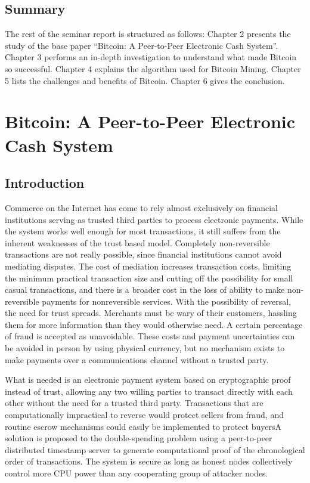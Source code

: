 \section{Summary}
The rest of the seminar report is structured as follows: Chapter 2 presents the
study of the base paper “Bitcoin: A Peer-to-Peer Electronic Cash System”. 
Chapter 3 performs an in-depth investigation to understand what made Bitcoin so 
successful. Chapter 4 explains the algorithm used for Bitcoin Mining. Chapter 5 
lists the challenges and benefits of Bitcoin. Chapter 6 gives the conclusion.

%
%

\chapter{Bitcoin: A Peer-to-Peer Electronic Cash System}
\section{Introduction}

Commerce on the Internet has come to rely almost exclusively on financial institutions serving as
trusted third parties to process electronic payments. While the system works well enough for
most transactions, it still suffers from the inherent weaknesses of the trust based model.
Completely non-reversible transactions are not really possible, since financial institutions cannot
avoid mediating disputes. The cost of mediation increases transaction costs, limiting the
minimum practical transaction size and cutting off the possibility for small casual transactions,
and there is a broader cost in the loss of ability to make non-reversible payments for nonreversible
services. With the possibility of reversal, the need for trust spreads. Merchants must
be wary of their customers, hassling them for more information than they would otherwise need.
A certain percentage of fraud is accepted as unavoidable. These costs and payment uncertainties
can be avoided in person by using physical currency, but no mechanism exists to make payments
over a communications channel without a trusted party\cite{nakamoto2012bitcoin}.

What is needed is an electronic payment system based on cryptographic proof instead of trust,
allowing any two willing parties to transact directly with each other without the need for a trusted
third party. Transactions that are computationally impractical to reverse would protect sellers
from fraud, and routine escrow mechanisms could easily be implemented to protect buyersA solution is proposed  to the double-spending problem using a peer-to-peer distributed
timestamp server to generate computational proof of the chronological order of transactions. The
system is secure as long as honest nodes collectively control more CPU power than any
cooperating group of attacker nodes.

